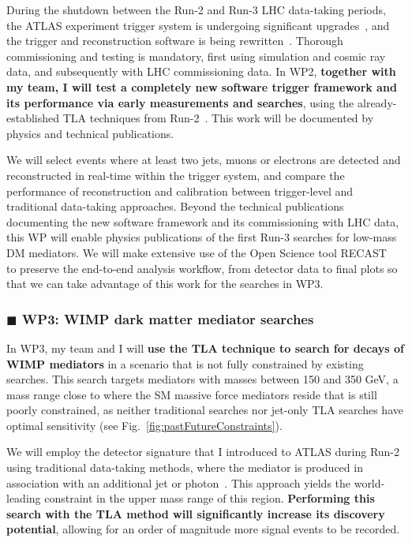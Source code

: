 \documentclass[11pt,a4paper]{article}
\begin{document}
During the shutdown between the Run-2 and Run-3 LHC data-taking periods, the ATLAS experiment trigger system is undergoing significant upgrades~\cite{Aad:1602235}, and the trigger and reconstruction software is being rewritten~\cite{Bielski:2674286}. %
Thorough commissioning and testing is mandatory, first using simulation and cosmic ray data, and subsequently with LHC commissioning data. 
In WP2, \textbf{together with my team, I will test a completely new software trigger framework and its performance via early measurements and searches}, using the already-established TLA techniques from Run-2~\cite{Aaboud:2018fzt}. This work will be documented by physics and technical publications.  

We will select events where at least two jets, muons or electrons are detected and reconstructed in real-time within the trigger system, and compare the performance of reconstruction and calibration between trigger-level and traditional data-taking approaches. 
Beyond the technical publications documenting the new software framework and its commissioning with LHC data, this WP will enable physics publications of the first Run-3 searches for low-mass DM mediators. 
We will make extensive use of the Open Science tool RECAST~\cite{Schuy:2019awp} to preserve the end-to-end analysis workflow, from detector data to final plots so that we can take advantage of this work for the searches in WP3.  

\subsubsection*{\color{yellow} $\blacksquare$ \color{black} WP3: WIMP dark matter mediator searches}

In WP3, my team and I will \textbf{use the TLA technique to search for decays of WIMP mediators} in a scenario that is not fully constrained by existing searches.
This search targets mediators with masses between 150 and 350 GeV, a mass range close to where the SM massive force mediators reside that is still poorly constrained, as neither traditional searches nor jet-only TLA searches have optimal sensitivity (see Fig.~\ref{fig:pastFutureConstraints}).  

We will employ the detector signature that I introduced to ATLAS during Run-2 using traditional data-taking methods, where the mediator is produced in association with an additional jet or photon~\cite{Aaboud:2019zxd}. 
This approach yields the world-leading constraint in the upper mass range of this region. 
\textbf{Performing this search with the TLA method will significantly increase its discovery potential}, 
allowing for an order of magnitude more signal events to be recorded.%
\end{document}
